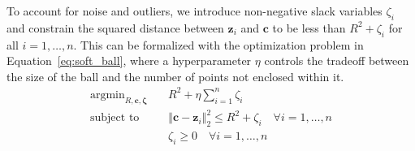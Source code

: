 \documentclass{article}
\DeclareMathOperator*{\argmin}{\mathrm{argmin}}
\newcommand{\st}{\mathop{\mathrm{subject\,\,to}}}
\begin{document}
To account for noise and outliers, we introduce non-negative slack variables $\zeta_i$ and constrain the squared distance between $\boldsymbol{z}_i$ and $\boldsymbol{c}$ to be less than $R^2 + \zeta_i$ for all $i=1,\dotsc,n$. This can be formalized with the optimization problem in Equation~\ref{eq:soft_ball}, where a hyperparameter $\eta$ controls the tradeoff between the size of the ball and the number of points not enclosed within it. 
\begin{align}
\argmin_{R,\boldsymbol{c},\boldsymbol{\zeta}}&\quad R^{2}+\eta \sum_{i=1}^{n} \zeta_i \nonumber \\ \st&\quad\left\Vert \boldsymbol{c}-\boldsymbol{z}_{i}\right\Vert _{2}^{2}\leq R^{2}+\zeta_{i}\quad \forall i=1,\dotsc,n \label{eq:soft_ball} \\
&\quad \zeta_{i}\geq0\quad \forall i=1,\dotsc,n \nonumber
\end{align}
\end{document}
